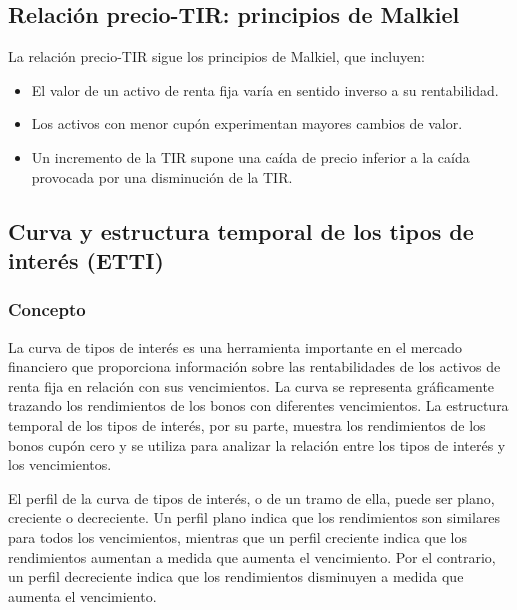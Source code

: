 \documentclass[
  letterpaper,
  DIV=11,
  numbers=noendperiod]{scrartcl}
\providecommand{\tightlist}{%
  \setlength{\itemsep}{0pt}\setlength{\parskip}{0pt}}\usepackage{longtable,booktabs,array}
\begin{document}
\hypertarget{relaciuxf3n-precio-tir-principios-de-malkiel}{%
\subsection{Relación precio-TIR: principios de
Malkiel}\label{relaciuxf3n-precio-tir-principios-de-malkiel}}

La relación precio-TIR sigue los principios de Malkiel, que incluyen:

\begin{itemize}
\tightlist
\item
  El valor de un activo de renta fija varía en sentido inverso a su
  rentabilidad.
\item
  Los activos con menor cupón experimentan mayores cambios de valor.
\item
  Un incremento de la TIR supone una caída de precio inferior a la caída
  provocada por una disminución de la TIR.
\end{itemize}

\hypertarget{curva-y-estructura-temporal-de-los-tipos-de-interuxe9s-etti}{%
\subsection{Curva y estructura temporal de los tipos de interés
(ETTI)}\label{curva-y-estructura-temporal-de-los-tipos-de-interuxe9s-etti}}

\hypertarget{concepto-2}{%
\subsubsection{Concepto}\label{concepto-2}}

La curva de tipos de interés es una herramienta importante en el mercado
financiero que proporciona información sobre las rentabilidades de los
activos de renta fija en relación con sus vencimientos. La curva se
representa gráficamente trazando los rendimientos de los bonos con
diferentes vencimientos. La estructura temporal de los tipos de interés,
por su parte, muestra los rendimientos de los bonos cupón cero y se
utiliza para analizar la relación entre los tipos de interés y los
vencimientos.

El perfil de la curva de tipos de interés, o de un tramo de ella, puede
ser plano, creciente o decreciente. Un perfil plano indica que los
rendimientos son similares para todos los vencimientos, mientras que un
perfil creciente indica que los rendimientos aumentan a medida que
aumenta el vencimiento. Por el contrario, un perfil decreciente indica
que los rendimientos disminuyen a medida que aumenta el vencimiento.
\end{document}
